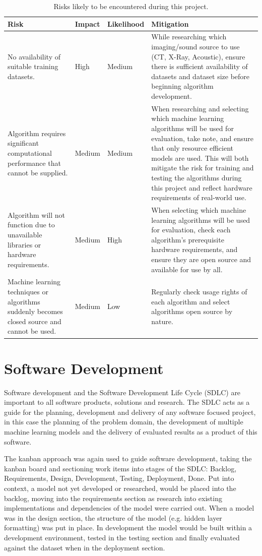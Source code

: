 \begin{table}[H]
    \caption{Risks likely to be encountered during this project.}
    \centering
    \begin{tabular}{p{}|p{}|p{}|p{}}
    Risk & Impact & Likelihood & Mitigation\\
    \hline\hline
    No availability of suitable training datasets. & High & Medium & While researching which imaging/sound source to use (CT, X-Ray, Acoustic), ensure there is sufficient availability of datasets and dataset size before beginning algorithm development.\\
    Algorithm requires significant computational performance that cannot be supplied. & Medium & Medium & When researching and selecting which machine learning algorithms will be used for evaluation, take note, and ensure that only resource efficient models are used. This will both mitigate the risk for training and testing the algorithms during this project and reflect hardware requirements of real-world use.\\
    Algorithm will not function due to   unavailable libraries or hardware requirements. & Medium & High & When selecting which machine learning algorithms will be used for evaluation, check each algorithm’s prerequisite hardware requirements, and ensure they are open source and available for use by all.\\
    Machine learning techniques or algorithms suddenly becomes closed source and cannot be used. & Medium & Low & Regularly check usage rights of each algorithm and select algorithms open source by nature.\\ 
    \end{tabular}
    \label{tbl:risk-table}
\end{table}

\section{Software Development}
Software development and the Software Development Life Cycle (SDLC) are important to all software products, solutions and research. The SDLC acts as a guide for the planning, development and delivery of any software focused project, in this case the planning of the problem domain, the development of multiple machine learning models and the delivery of evaluated results as a product of this software.

The kanban approach was again used to guide software development, taking the kanban board and sectioning work items into stages of the SDLC: Backlog, Requirements, Design, Development, Testing, Deployment, Done. Put into context, a model not yet developed or researched, would be placed into the backlog, moving into the requirements section as research into existing implementations and dependencies of the model were carried out. When a model was in the design section, the structure of the model (e.g. hidden layer formatting) was put in place. In development the model would be built within a development environment, tested in the testing section and finally evaluated against the dataset when in the deployment section.

